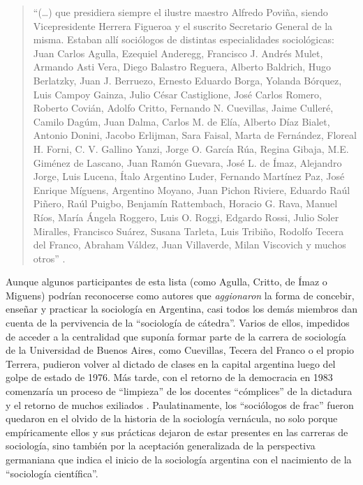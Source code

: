 \begin{quote}
\enquote{(\dots) que presidiera siempre el ilustre maestro Alfredo Poviña, siendo Vicepresidente Herrera Figueroa y el suscrito Secretario General de la misma. Estaban allí sociólogos de distintas especialidades sociológicas: Juan Carlos Agulla, Ezequiel Anderegg, Francisco J. Andrés Mulet, Armando Asti Vera, Diego Balastro Reguera, Alberto Baldrich, Hugo Berlatzky, Juan J. Berruezo, Ernesto Eduardo Borga, Yolanda Bórquez, Luis Campoy Gainza, Julio César Castiglione, José Carlos Romero, Roberto Covián, Adolfo Critto, Fernando N. Cuevillas, Jaime Culleré, Camilo Dagúm, Juan Dalma, Carlos M. de Elía, Alberto Díaz Bialet, Antonio Donini, Jacobo Erlijman, Sara Faisal, Marta de Fernández, Floreal H. Forni, C. V. Gallino Yanzi, Jorge O. García Rúa, Regina Gibaja, M.E. Giménez de Lascano, Juan Ramón Guevara, José L. de Ímaz, Alejandro Jorge, Luis Lucena, Ítalo Argentino Luder, Fernando Martínez Paz, José Enrique Míguens, Argentino Moyano, Juan Pichon Riviere, Eduardo Raúl Piñero, Raúl Puigbo, Benjamín Rattembach, Horacio G. Rava, Manuel Ríos, María Ángela Roggero, Luis O. Roggi, Edgardo Rossi, Julio Soler Miralles, Francisco Suárez, Susana Tarleta, Luis Tribiño, Rodolfo Tecera del Franco, Abraham Váldez, Juan Villaverde, Milan Viscovich y muchos otros} \parencite{1585-DAVID2000}.
\end{quote}

Aunque algunos participantes de esta lista (como Agulla, Critto, de Ímaz o Miguens) podrían reconocerse como autores que \emph{aggionaron} la forma de concebir, enseñar y practicar la sociología en Argentina, casi todos los demás miembros dan cuenta de la pervivencia de la \enquote{sociología de cátedra}. Varios de ellos, impedidos de acceder a la centralidad que suponía formar parte de la carrera de sociología de la Universidad de Buenos Aires, como Cuevillas, Tecera del Franco o el propio Terrera, pudieron volver al dictado de clases en la capital argentina luego del golpe de estado de 1976. Más tarde, con el retorno de la democracia en 1983 comenzaría un proceso de \enquote{limpieza} de los docentes \enquote{cómplices} de la dictadura y el retorno de muchos exiliados \parencite{1551-BLOIS2009,1552-BLOIS2019}. Paulatinamente, los \enquote{sociólogos de frac} fueron quedaron en el olvido de la historia de la sociología vernácula, no solo porque empíricamente ellos y sus prácticas dejaron de estar presentes en las carreras de sociología, sino también por la aceptación generalizada de la perspectiva germaniana que indica el inicio de la sociología argentina con el nacimiento de la \enquote{sociología científica}.

